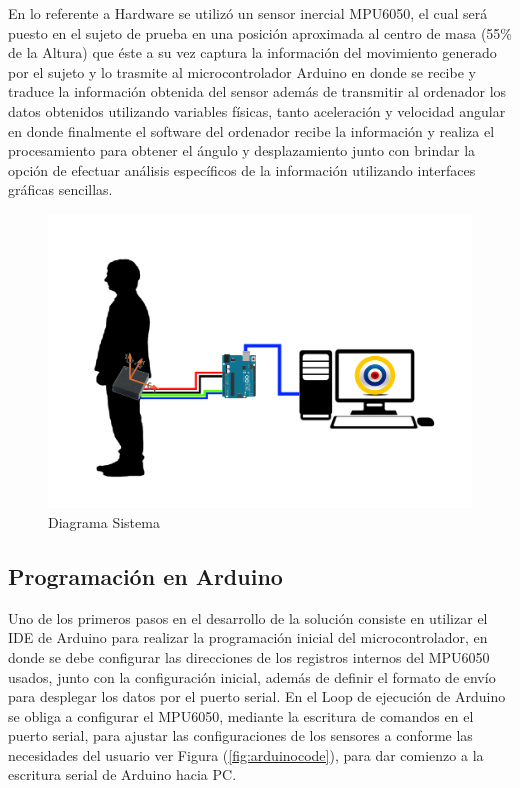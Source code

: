 \documentclass[12pt,a4paper]{article}
\begin{document}
En lo referente a Hardware se utilizó un sensor inercial MPU6050, el cual será puesto en el sujeto de prueba en una posición aproximada al centro de masa (55\% de la Altura) que éste a su vez captura la información del movimiento generado por el sujeto y lo trasmite al microcontrolador Arduino en donde se recibe y traduce la información obtenida del sensor además de transmitir al ordenador los datos obtenidos utilizando variables físicas, tanto aceleración y velocidad angular en donde finalmente el software del ordenador recibe la información y realiza el procesamiento para obtener el ángulo y desplazamiento junto con brindar la opción de efectuar análisis específicos de la información utilizando interfaces gráficas sencillas.


\begin{figure}[H]
	\centering
	\includegraphics[scale=0.15]{images/diagrama_sistema}
	\caption{Diagrama Sistema}
	\label{fig:diagramasistema}
\end{figure}

\subsection{Programación en Arduino}
Uno de los primeros pasos en el desarrollo de la solución consiste en utilizar el IDE de Arduino para realizar la programación inicial del microcontrolador, en donde se debe configurar las direcciones de los registros internos del MPU6050 usados, junto con la configuración inicial, además de definir el formato de envío para desplegar los datos por el puerto serial.
En el Loop de ejecución de Arduino se obliga a configurar el MPU6050, mediante la escritura de comandos en el puerto serial, para ajustar las configuraciones de los sensores a conforme las necesidades del usuario ver Figura (\ref{fig:arduinocode}), para dar comienzo a la escritura serial de Arduino hacia PC.
\end{document}
